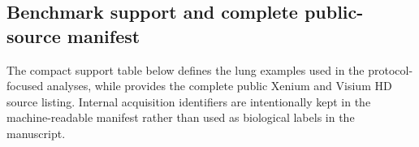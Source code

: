 \documentclass[sigconf,review]{acmart}
\begin{document}
\subsection{Benchmark support and complete public-source manifest}
\label{sec:benchmark_manifest}
The compact support table below defines the lung examples used in the
protocol-focused analyses, while
 provides the complete public Xenium and
Visium HD source listing. Internal acquisition identifiers are intentionally
kept in the machine-readable manifest rather than used as biological labels in
the manuscript.

\begin{table}[t]
\centering
\scriptsize
\setlength{\tabcolsep}{5pt}
\caption{Benchmark-support summary for the lung subsets instantiated in this appendix. ``Cross-patient'' denotes transfer between distinct samples under matched preprocessing; ``cross-platform'' denotes transfer between Visium HD and Xenium under shared-gene evaluation.}
\label{tab:benchmark_support}
\end{table}
\end{document}
